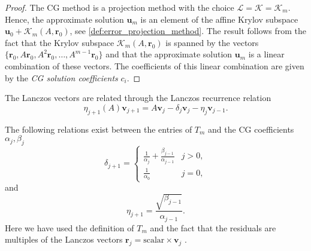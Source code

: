 \begin{proof}
  The CG method is a projection method with the choice $\mathcal{L} = \mathcal{K} = \mathcal{K}_m$. Hence, the approximate solution $\mathbf{u}_m$ is an element of the affine Krylov subspace $\mathbf{u}_0 + \mathcal{K}_m(A, \mathbf{r}_0)$, see \cref{def:error_projection_method}. The result follows from the fact that the Krylov subspace $\mathcal{K}_m(A, \mathbf{r}_0)$ is spanned by the vectors $\{\mathbf{r}_0, A\mathbf{r}_0, A^2\mathbf{r}_0, \dots, A^{m-1}\mathbf{r}_0\}$ and that the approximate solution $\mathbf{u}_m$ is a linear combination of these vectors. The coefficients of this linear combination are given by the \textit{CG solution coefficients} $c_i$.
\end{proof}

The Lanczos vectors are related through the Lanczos recurrence relation
\begin{equation}
  \label{eq:lanczos_recurrence}
  \eta_{j+1}(A)\mathbf{v}_{j+1} = A \mathbf{v}_j - \delta_j \mathbf{v}_j - \eta_j \mathbf{v}_{j-1}.
\end{equation}

The following relations exist between the entries of $T_m$ and the CG coefficients $\alpha_j, \beta_j$
\begin{equation}
  \delta_{j+1} =
  \begin{cases}
    \frac{1}{\alpha_j} + \frac{\beta_{j-1}}{\alpha_{j-1}} & j > 0, \\
    \frac{1}{\alpha_0}                                    & j = 0,
  \end{cases}
  \label{eq:cg_hessenberg_delta}
\end{equation}
and
\begin{equation}
  \eta_{j+1} = \frac{\sqrt{\beta_{j-1}}}{\alpha_{j-1}}.
  \label{eq:cg_hessenberg_eta}
\end{equation}
Here we have used the definition of $T_m$ and the fact that the residuals are multiples of the Lanczos vectors $\mathbf{r}_j = \text{scalar} \times \mathbf{v}_j$ \cite[Equation 6.103]{iter_method_saad}.

